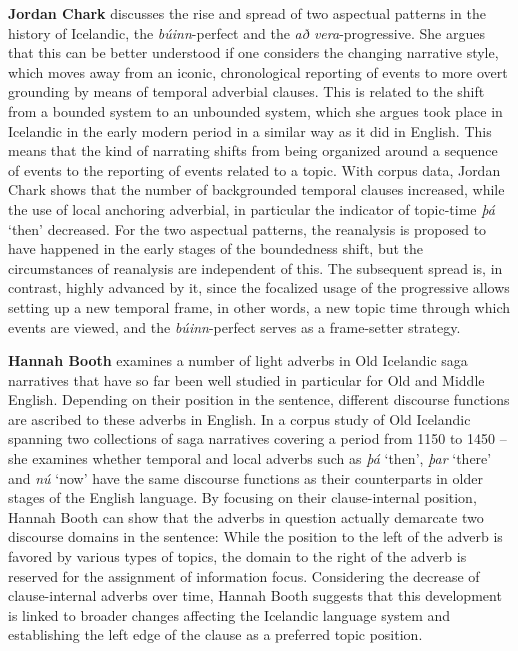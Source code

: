 \documentclass[output=paper,colorlinks,citecolor=brown]{langscibook}
\begin{document}
\bigskip
\noindent
\textbf{Jordan Chark} discusses the rise and spread of two aspectual patterns in the history of Icelandic, the \textit{búinn}-perfect and the \textit{að vera}-progressive. She argues that this can be better understood if one considers the changing narrative style, which moves away from an iconic, chronological reporting of events to more overt grounding by means of temporal adverbial clauses. This is related to the shift from a bounded system to an unbounded system, which she argues took place in Icelandic in the early modern period in a similar way as it did in English. This means that the kind of narrating shifts from being organized around a sequence of events to the reporting of events related to a topic. With corpus data, Jordan Chark shows that the number of backgrounded temporal clauses increased, while the use of local anchoring adverbial, in particular the indicator of topic-time \textit{þá} `then' decreased. For the two aspectual patterns, the reanalysis is proposed to have happened in the early stages of the boundedness shift, but the circumstances of reanalysis are independent of this. The subsequent spread is, in contrast, highly advanced by it, since the focalized usage of the progressive allows setting up a new temporal frame, in other words, a new topic time through which events are viewed, and the \textit{búinn}-perfect serves as a frame-setter strategy.

\bigskip
\noindent
\textbf{Hannah Booth} examines a number of light adverbs in Old Icelandic saga narratives that have so far been well studied in particular for Old and Middle English. Depending on their position in the sentence, different discourse functions are ascribed to these adverbs in English. In a corpus study of Old Icelandic spanning two collections of saga narratives covering a period from 1150 to 1450 -- she examines whether temporal and local adverbs such as \textit{þá} `then', \textit{þar} `there' and \textit{nú} `now' have the same discourse functions as their counterparts in older stages of the English language. By focusing on their clause-internal position, Hannah Booth can show that the adverbs in question actually demarcate two discourse domains in the sentence: While the position to the left of the adverb is favored by various types of topics, the domain to the right of the adverb is reserved for the assignment of information focus. Considering the decrease of clause-internal adverbs over time, Hannah Booth suggests that this development is linked to broader changes affecting the Icelandic language system and establishing the left edge of the clause as a preferred topic position.   
 
\end{document}
